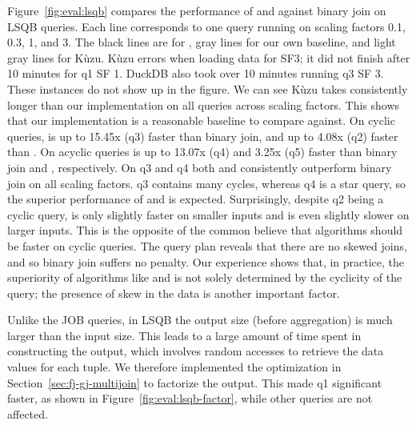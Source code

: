 Figure~\ref{fig:eval:lsqb} compares the performance of \FJ and \GJ against binary join on LSQB queries.
Each line corresponds to one query running on scaling factors 0.1, 0.3, 1, and 3.
The black lines are for \FJ, gray lines for our own \GJ baseline, and light gray lines for K\`uzu.
K\`uzu errors when loading data for SF3;
it did not finish after 10 minutes for q1 SF 1. 
DuckDB also took over 10 minutes running q3 SF 3. 
These instances do not show up in the figure.
We can see K\`uzu takes consistently longer than our \GJ implementation
 on all queries across scaling factors.
This shows that our \GJ implementation is a reasonable baseline to compare against.
On cyclic queries, \FJ is up to 15.45x (q3) faster than binary join, 
  and up to 4.08x (q2) faster than \GJ.
On acyclic queries \FJ is up to 13.07x (q4) and 3.25x (q5) faster than binary join and \GJ, respectively.
On q3 and q4 both \FJ and \GJ consistently outperform binary join on all scaling factors.
q3 contains many cycles, whereas q4 is a star query, so the superior performance of \FJ and \GJ is expected.
Surprisingly, despite q2 being a cyclic query, 
  \FJ is only slightly faster on smaller inputs
  and is even slightly slower on larger inputs.
This is the opposite of the common believe that \WCOJ algorithms
  should be faster on cyclic queries.
The query plan reveals that there are no skewed joins,
  and so binary join suffers no penalty.
Our experience shows that, in practice, 
  the superiority of \WCOJ algorithms like \FJ and \GJ
  is not solely determined by the cyclicity of the query;
  the presence of skew in the data is another important factor.

Unlike the JOB queries, in LSQB the output size (before aggregation)
  is much larger than the input size.
This leads to a large amount of time spent in constructing the output, 
  which involves random accesses to retrieve the data values for each tuple.
We therefore implemented the optimization in Section~\ref{sec:fj-gj-multijoin}
  to factorize the output.
This made q1 significant faster, as shown in Figure~\ref{fig:eval:lsqb-factor},
  while other queries are not affected.

